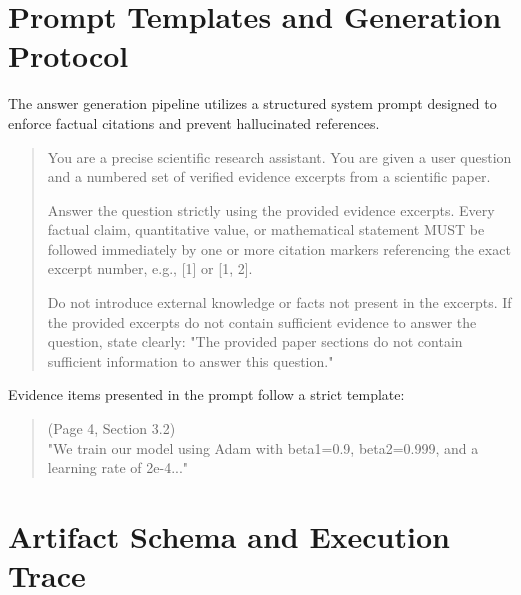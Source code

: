 \section{Prompt Templates and Generation Protocol}
\label{app:prompts}

The answer generation pipeline utilizes a structured system prompt designed to enforce factual citations and prevent hallucinated references.

\begin{quote}
\small\ttfamily
You are a precise scientific research assistant. You are given a user question and a numbered set of verified evidence excerpts from a scientific paper.

Answer the question strictly using the provided evidence excerpts. Every factual claim, quantitative value, or mathematical statement MUST be followed immediately by one or more citation markers referencing the exact excerpt number, e.g., [1] or [1, 2].

Do not introduce external knowledge or facts not present in the excerpts. If the provided excerpts do not contain sufficient evidence to answer the question, state clearly: "The provided paper sections do not contain sufficient information to answer this question."
\end{quote}

Evidence items presented in the prompt follow a strict template:
\begin{quote}
\small\ttfamily
[Excerpt 1] (Page 4, Section 3.2)\\
"We train our model using Adam with beta1=0.9, beta2=0.999, and a learning rate of 2e-4..."
\end{quote}

\section{Artifact Schema and Execution Trace}
\label{app:trace_schema}

